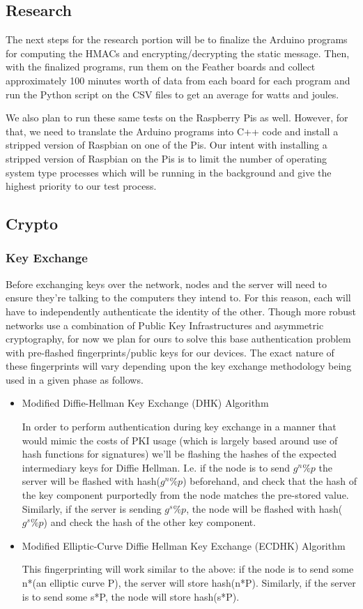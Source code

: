 \documentclass[tikz,a4paper,titlepage]{article}
\begin{document}
\subsection{Research}
The next steps for the research portion will be to finalize the Arduino programs for computing the HMACs and encrypting/decrypting the static message. Then, with the finalized programs, run them on the Feather boards and collect approximately 100 minutes worth of data from each board for each program and run the Python script on the CSV files to get an average for watts and joules.

We also plan to run these same tests on the Raspberry Pis as well. However, for that, we need to translate the Arduino programs into C++ code and install a stripped version of Raspbian on one of the Pis. Our intent with installing a stripped version of Raspbian on the Pis is to limit the number of operating system type processes which will be running in the background and give the highest priority to our test process.

\subsection{Crypto}

\subsubsection{Key Exchange}

Before exchanging keys over the network, nodes and the server will need to ensure they're talking to the computers they intend to. For this reason, each will have to independently authenticate the identity of the other. Though more robust networks use a combination of Public Key Infrastructures and asymmetric cryptography, for now we plan for ours to solve this base authentication problem with pre-flashed fingerprints/public keys for our devices. The exact nature of these fingerprints will vary depending upon the key exchange methodology being used in a given phase as follows.
\begin{itemize}
    \item Modified Diffie-Hellman Key Exchange (DHK) Algorithm
    
    In order to perform authentication during key exchange in a manner that would mimic the costs of PKI usage (which is largely based around use of hash functions for signatures) we'll be flashing the hashes of the expected intermediary keys for Diffie Hellman. I.e. if the node is to send $g^n \%p$ the server will be flashed with hash($g^n\%p$) beforehand, and check that the hash of the key component purportedly from the node matches the pre-stored value. Similarly, if the server is sending $g^s \%p$, the node will be flashed with hash($g^s \%p$) and check the hash of the other key component.
    \item Modified Elliptic-Curve Diffie Hellman Key Exchange (ECDHK) Algorithm
    
    This fingerprinting will work similar to the above: if the node is to send some n*(an elliptic curve P), the server will store hash(n*P). Similarly, if the server is to send some s*P, the node will store hash(s*P).
\end{itemize}
\end{document}

